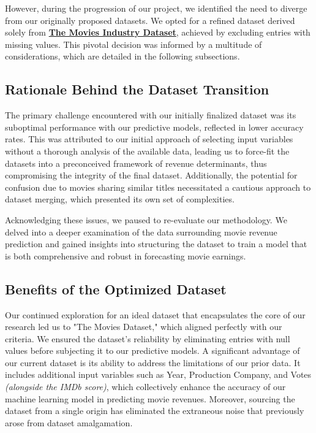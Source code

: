 \documentclass[conference]{IEEEtran}
\begin{document}
        However, during the progression of our project, we identified the need to diverge from our originally proposed datasets. We opted for a refined dataset derived solely from \href{https://www.kaggle.com/datasets/danielgrijalvas/movies}{\textbf{The Movies Industry Dataset}}, achieved by excluding entries with missing values. This pivotal decision was informed by a multitude of considerations, which are detailed in the following subsections.
    
    \subsection{Rationale Behind the Dataset Transition}
        The primary challenge encountered with our initially finalized dataset was its suboptimal performance with our predictive models, reflected in lower accuracy rates. This was attributed to our initial approach of selecting input variables without a thorough analysis of the available data, leading us to force-fit the datasets into a preconceived framework of revenue determinants, thus compromising the integrity of the final dataset. Additionally, the potential for confusion due to movies sharing similar titles necessitated a cautious approach to dataset merging, which presented its own set of complexities.
        
        Acknowledging these issues, we paused to re-evaluate our methodology. We delved into a deeper examination of the data surrounding movie revenue prediction and gained insights into structuring the dataset to train a model that is both comprehensive and robust in forecasting movie earnings.
    
    \subsection{Benefits of the Optimized Dataset}
        Our continued exploration for an ideal dataset that encapsulates the core of our research led us to "The Movies Dataset," which aligned perfectly with our criteria. We ensured the dataset's reliability by eliminating entries with null values before subjecting it to our predictive models. A significant advantage of our current dataset is its ability to address the limitations of our prior data. It includes additional input variables such as Year, Production Company, and Votes \textit{(alongside the IMDb score)}, which collectively enhance the accuracy of our machine learning model in predicting movie revenues. Moreover, sourcing the dataset from a single origin has eliminated the extraneous noise that previously arose from dataset amalgamation.
\end{document}
